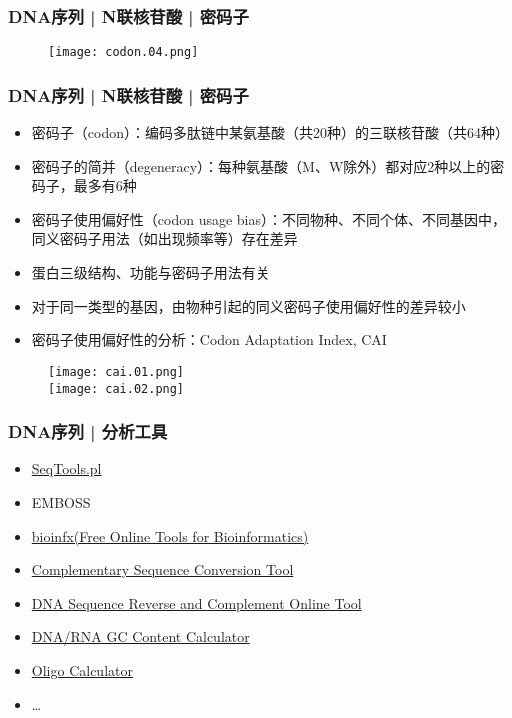 \begin{frame}
  \frametitle{DNA序列 | N联核苷酸 | 密码子}
  \begin{figure}
    \centering
    \texttt{[image: codon.04.png]}
  \end{figure}
\end{frame}

\begin{frame}
  \frametitle{DNA序列 | N联核苷酸 | 密码子}
  \begin{itemize}
    \item 密码子（codon）：编码多肽链中某氨基酸（共20种）的三联核苷酸（共64种）
    \item 密码子的简并（degeneracy）：每种氨基酸（M、W除外）都对应2种以上的密码子，最多有6种
    \item 密码子使用偏好性（codon usage bias）：不同物种、不同个体、不同基因中，同义密码子用法（如出现频率等）存在差异
    \item 蛋白三级结构、功能与密码子用法有关
    \item 对于同一类型的基因，由物种引起的同义密码子使用偏好性的差异较小
    \item 密码子使用偏好性的分析：Codon Adaptation Index, CAI
  \end{itemize}
  \begin{figure}
    \centering
    \texttt{[image: cai.01.png]}
    \\
    \texttt{[image: cai.02.png]}
  \end{figure}
\end{frame}

\begin{frame}
  \frametitle{DNA序列 | 分析工具}
  \begin{itemize}
    \item \href{http://yixf.name/2011/06/01/\%E5\%AF\%B9fasta\%E6\%A0\%BC\%E5\%BC\%8F\%E7\%9A\%84\%E7\%AE\%80\%E5\%8D\%95\%E5\%A4\%84\%E7\%90\%86\%E4\%B8\%8E\%E7\%BB\%9F\%E8\%AE\%A1/}{SeqTools.pl}
    \item EMBOSS
    \item \href{http://bioinfx.net/}{bioinfx(Free Online Tools for Bioinformatics)}
    \item \href{http://clasher.myweb.uga.edu/testpages/seqconv.html}{Complementary Sequence Conversion Tool}
    \item \href{http://www.cellbiol.com/scripts/complement/dna\_sequence\_reverse\_complement.php}{DNA Sequence Reverse and Complement Online Tool}
    \item \href{http://www.endmemo.com/bio/gc.php}{DNA/RNA GC Content Calculator}
    \item \href{http://www.sciencelauncher.com/oligocalc.html}{Oligo Calculator}
    \item \ldots
  \end{itemize}
\end{frame}

